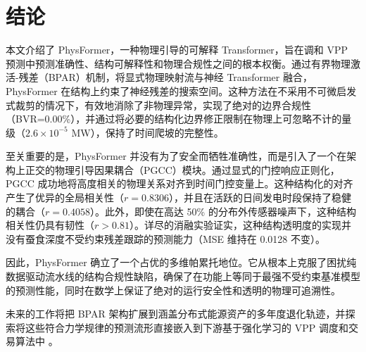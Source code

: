 \section{结论}
\label{sec:conclusion}

本文介绍了 PhysFormer，一种物理引导的可解释 Transformer，旨在调和 VPP 预测中预测准确性、结构可解释性和物理合规性之间的根本权衡。通过有界物理激活-残差（BPAR）机制，将显式物理映射流与神经 Transformer 融合，PhysFormer 在结构上约束了神经残差的搜索空间。这种方法在不采用不可微启发式裁剪的情况下，有效地消除了非物理异常，实现了绝对的边界合规性（BVR=0.00\%），并通过将必要的结构化边界修正限制在物理上可忽略不计的量级（$2.6 \times 10^{-5}$ MW），保持了时间爬坡的完整性。

至关重要的是，PhysFormer 并没有为了安全而牺牲准确性，而是引入了一个在架构上正交的物理引导因果耦合（PGCC）模块。通过显式的门控响应正则化，PGCC 成功地将高度相关的物理关系对齐到时间门控变量上。这种结构化的对齐产生了优异的全局相关性（$r=0.8306$），并且在活跃的日间发电时段保持了稳健的耦合（$r=0.4058$）。此外，即使在高达 50\% 的分布外传感器噪声下，这种结构相关性仍具有韧性（$r > 0.81$）。详尽的消融实验证实，这种结构透明度的实现并没有蚕食深度不受约束残差跟踪的预测能力（MSE 维持在 0.0128 不变）。

因此，PhysFormer 确立了一个占优的多维帕累托地位。它从根本上克服了困扰纯数据驱动流水线的结构合规性缺陷，确保了在功能上等同于最强不受约束基准模型的预测性能，同时在数学上保证了绝对的运行安全性和透明的物理可追溯性。

未来的工作将把 BPAR 架构扩展到涵盖分布式能源资产的多年度退化轨迹，并探索将这些符合力学规律的预测流形直接嵌入到下游基于强化学习的 VPP 调度和交易算法中 \cite{Ma2025, Arabzadeh2025}。
